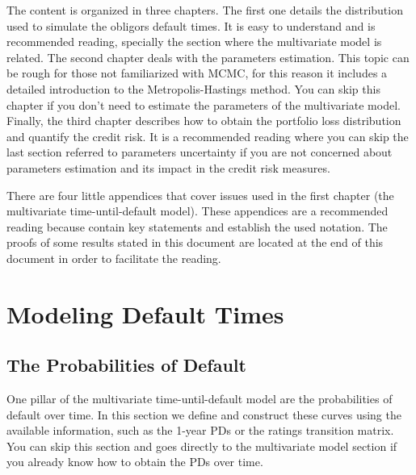 \documentclass[11pt,fleqn]{book} %
\begin{document}
The content is organized in three chapters. The first one details the 
distribution used to simulate the obligors default times. It is easy to 
understand and is recommended reading, specially the section where the 
multivariate model is related. The second chapter deals with the parameters 
estimation. This topic can be rough for those not familiarized 
with MCMC, for this reason it includes a detailed introduction to the 
Metropolis-Hastings method. You can skip this chapter if you don't need 
to estimate the parameters of the multivariate model. Finally, the 
third chapter describes how to obtain the portfolio loss distribution and 
quantify the credit risk. It is a recommended reading where you can skip the 
last section referred to parameters uncertainty if you are not concerned about 
parameters estimation and its impact in the credit risk measures.

There are four little appendices that cover issues used in the first chapter 
(the multivariate time-until-default model). These appendices are a recommended 
reading because contain key statements and establish the used notation.
The proofs of some results stated in this document are located at the end of 
this document in order to facilitate the reading.



\chapter{Modeling Default Times}
\label{chap:mdt}

\section{The Probabilities of Default}
\label{sec:pd}

One pillar of the multivariate time-until-default model are the probabilities 
of default over time. In this section we define and construct these curves 
using the available information, such as the 1-year PDs or the ratings 
transition matrix. You can skip this section and goes directly to the 
multivariate model section if you already know how to obtain the PDs over 
time.
\end{document}
